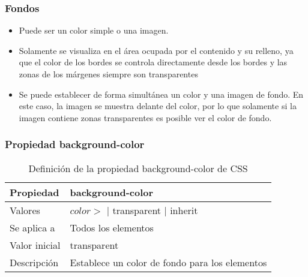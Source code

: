 
\begin{frame}
\frametitle{Fondos}

\begin{itemize}
  \item Puede ser un color simple o una imagen.
  \item Solamente se visualiza en el área ocupada por el contenido y su relleno, ya que el color de los bordes se controla directamente desde los bordes y las zonas de los márgenes siempre son transparentes
  \item Se puede establecer de forma simultánea un color y una imagen de fondo. En este caso, la imagen se muestra delante del color, por lo que solamente si la imagen contiene zonas transparentes es posible ver el color de fondo.
\end{itemize}

\end{frame}



\begin{frame}
\frametitle{Propiedad background-color}

\begin{center}
  \begin{table}
   \begin{tabular}{p{1.8cm}p{7.8cm}}
Propiedad & \bf{background-color} \\ \hline
Valores& $color>$ | transparent | inherit \\ \hline
Se aplica a& Todos los elementos \\ \hline
Valor inicial& transparent \\ \hline
Descripción& Establece un color de fondo para los elementos \\ \hline
  \end{tabular}
   \caption{Definición de la propiedad background-color de CSS}
 \end{table}
\end{center}


\end{frame}



